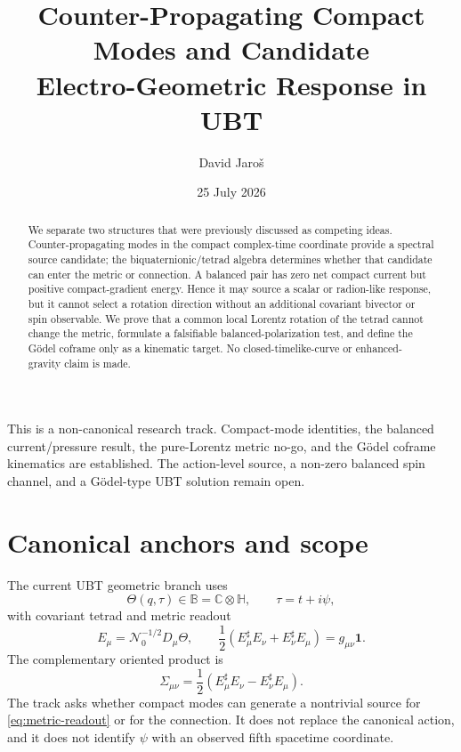 \documentclass[11pt]{article}
\title{Counter-Propagating Compact Modes and Candidate\\
Electro-Geometric Response in UBT}
\author{David Jaro\v{s}}
\date{25 July 2026}
\newcommand{\B}{\mathbb B}
\begin{document}
\maketitle

\begin{tcolorbox}[colback=yellow!8,colframe=black!45,title=Proof status]
This is a non-canonical research track.  Compact-mode identities, the balanced
current/pressure result, the pure-Lorentz metric no-go, and the Gödel coframe
kinematics are established.  The action-level source, a non-zero balanced spin
channel, and a Gödel-type UBT solution remain open.
\end{tcolorbox}

\begin{abstract}
We separate two structures that were previously discussed as competing ideas.
Counter-propagating modes in the compact complex-time coordinate provide a
spectral source candidate; the biquaternionic/tetrad algebra determines whether
that candidate can enter the metric or connection.  A balanced pair has zero
net compact current but positive compact-gradient energy.  Hence it may source
a scalar or radion-like response, but it cannot select a rotation direction
without an additional covariant bivector or spin observable.  We prove that a
common local Lorentz rotation of the tetrad cannot change the metric, formulate
a falsifiable balanced-polarization test, and define the Gödel coframe only as a
kinematic target.  No closed-timelike-curve or enhanced-gravity claim is made.
\end{abstract}

\section{Canonical anchors and scope}
The current UBT geometric branch uses
\begin{equation}
 \Theta(q,\tau)\in\B=\mathbb C\otimes\mathbb H,
 \qquad \tau=t+i\psi,
\end{equation}
with covariant tetrad and metric readout
\begin{equation}
 E_\mu=\mathcal N_0^{-1/2}D_\mu\Theta,
 \qquad
 \frac12\left(E_\mu^\sharp E_\nu+E_\nu^\sharp E_\mu\right)
 =g_{\mu\nu}\mathbf1.
 \label{eq:metric-readout}
\end{equation}
The complementary oriented product is
\begin{equation}
 \Sigma_{\mu\nu}
 =\frac12\left(E_\mu^\sharp E_\nu-E_\nu^\sharp E_\mu\right).
 \label{eq:sigma}
\end{equation}
The track asks whether compact modes can generate a nontrivial source for
\eqref{eq:metric-readout} or for the connection.  It does not replace the
canonical action, and it does not identify \(\psi\) with an observed fifth
spacetime coordinate.
\end{document}
